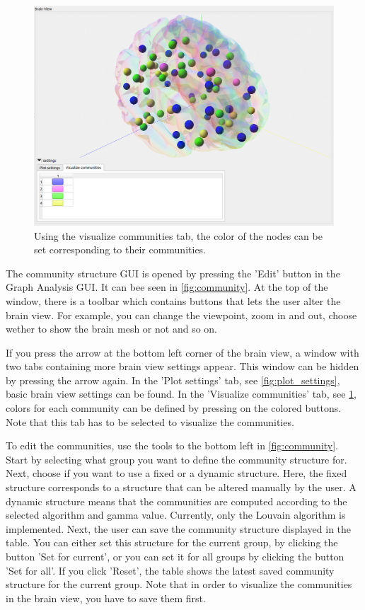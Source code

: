 \documentclass{article}
\begin{document}
\begin{figure}[h]
    \centering
    \includegraphics[width=\linewidth]{visualize_communities.png}
    \caption{Using the visualize communities tab, the color of the nodes can be set corresponding to their communities.}
    \label{fig:vis_com}
\end{figure}

The community structure GUI is opened by pressing the 'Edit' button in the Graph Analysis GUI. It can bee seen in \cref{fig:community}. At the top of the window, there is a toolbar which contains buttons that lets the user alter the brain view. For example, you can change the viewpoint, zoom in and out, choose wether to show the brain mesh or not and so on.

If you press the arrow at the bottom left corner of the brain view, a window with two tabs containing more brain view settings appear. This window can be hidden by pressing the arrow again. In the 'Plot settings' tab, see \cref{fig:plot_settings}, basic brain view settings can be found. In the 'Visualize communities' tab, see \cref{fig:vis_com}, colors for each community can be defined by pressing on the colored buttons. Note that this tab has to be selected to visualize the communities. 

To edit the communities, use the tools to the bottom left in \cref{fig:community}. Start by selecting what group you want to define the community structure for. Next, choose if you want to use a fixed or a dynamic structure. Here, the fixed structure corresponds to a structure that can be altered manually by the user. A dynamic structure means that the communities are computed according to the selected algorithm and gamma value. Currently, only the Louvain algorithm is implemented. Next, the user can save the community structure displayed in the table. You can either set this structure for the current group, by clicking the button 'Set for current', or you can set it for all groups by clicking the button 'Set for all'. If you click 'Reset', the table shows the latest saved community structure for the current group. Note that in order to visualize the communities in the brain view, you have to save them first.
\end{document}

